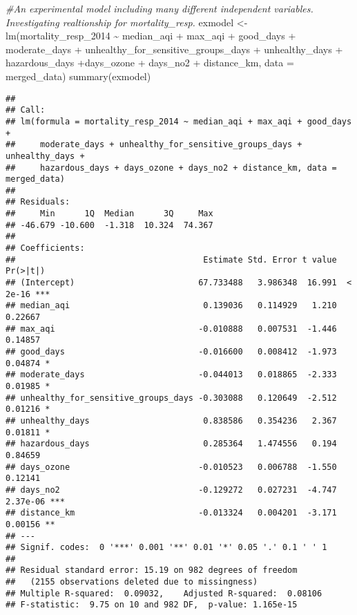\documentclass[
]{article}
\newenvironment{Shaded}{\begin{snugshade}}{\end{snugshade}}
\newcommand{\AttributeTok}[1]{\textcolor[rgb]{0.77,0.63,0.00}{#1}}
\newcommand{\CommentTok}[1]{\textcolor[rgb]{0.56,0.35,0.01}{\textit{#1}}}
\newcommand{\FunctionTok}[1]{\textcolor[rgb]{0.00,0.00,0.00}{#1}}
\newcommand{\NormalTok}[1]{#1}
\newcommand{\OtherTok}[1]{\textcolor[rgb]{0.56,0.35,0.01}{#1}}
\newcommand{\SpecialCharTok}[1]{\textcolor[rgb]{0.00,0.00,0.00}{#1}}
\begin{document}
\begin{Shaded}
\begin{Highlighting}[]
\CommentTok{\#An experimental model including many different independent variables. Investigating realtionship for mortality\_resp. }
\NormalTok{exmodel }\OtherTok{\textless{}{-}} \FunctionTok{lm}\NormalTok{(mortality\_resp\_2014 }\SpecialCharTok{\textasciitilde{}}\NormalTok{ median\_aqi }\SpecialCharTok{+}\NormalTok{ max\_aqi }\SpecialCharTok{+}\NormalTok{ good\_days }\SpecialCharTok{+}\NormalTok{ moderate\_days }\SpecialCharTok{+}\NormalTok{ unhealthy\_for\_sensitive\_groups\_days }\SpecialCharTok{+}\NormalTok{ unhealthy\_days }\SpecialCharTok{+}\NormalTok{ hazardous\_days }\SpecialCharTok{+}\NormalTok{days\_ozone }\SpecialCharTok{+}\NormalTok{ days\_no2 }\SpecialCharTok{+}\NormalTok{ distance\_km, }\AttributeTok{data =}\NormalTok{ merged\_data)}
\FunctionTok{summary}\NormalTok{(exmodel)}
\end{Highlighting}
\end{Shaded}

\begin{verbatim}
## 
## Call:
## lm(formula = mortality_resp_2014 ~ median_aqi + max_aqi + good_days + 
##     moderate_days + unhealthy_for_sensitive_groups_days + unhealthy_days + 
##     hazardous_days + days_ozone + days_no2 + distance_km, data = merged_data)
## 
## Residuals:
##     Min      1Q  Median      3Q     Max 
## -46.679 -10.600  -1.318  10.324  74.367 
## 
## Coefficients:
##                                      Estimate Std. Error t value Pr(>|t|)    
## (Intercept)                         67.733488   3.986348  16.991  < 2e-16 ***
## median_aqi                           0.139036   0.114929   1.210  0.22667    
## max_aqi                             -0.010888   0.007531  -1.446  0.14857    
## good_days                           -0.016600   0.008412  -1.973  0.04874 *  
## moderate_days                       -0.044013   0.018865  -2.333  0.01985 *  
## unhealthy_for_sensitive_groups_days -0.303088   0.120649  -2.512  0.01216 *  
## unhealthy_days                       0.838586   0.354236   2.367  0.01811 *  
## hazardous_days                       0.285364   1.474556   0.194  0.84659    
## days_ozone                          -0.010523   0.006788  -1.550  0.12141    
## days_no2                            -0.129272   0.027231  -4.747 2.37e-06 ***
## distance_km                         -0.013324   0.004201  -3.171  0.00156 ** 
## ---
## Signif. codes:  0 '***' 0.001 '**' 0.01 '*' 0.05 '.' 0.1 ' ' 1
## 
## Residual standard error: 15.19 on 982 degrees of freedom
##   (2155 observations deleted due to missingness)
## Multiple R-squared:  0.09032,    Adjusted R-squared:  0.08106 
## F-statistic:  9.75 on 10 and 982 DF,  p-value: 1.165e-15
\end{verbatim}
\end{document}
